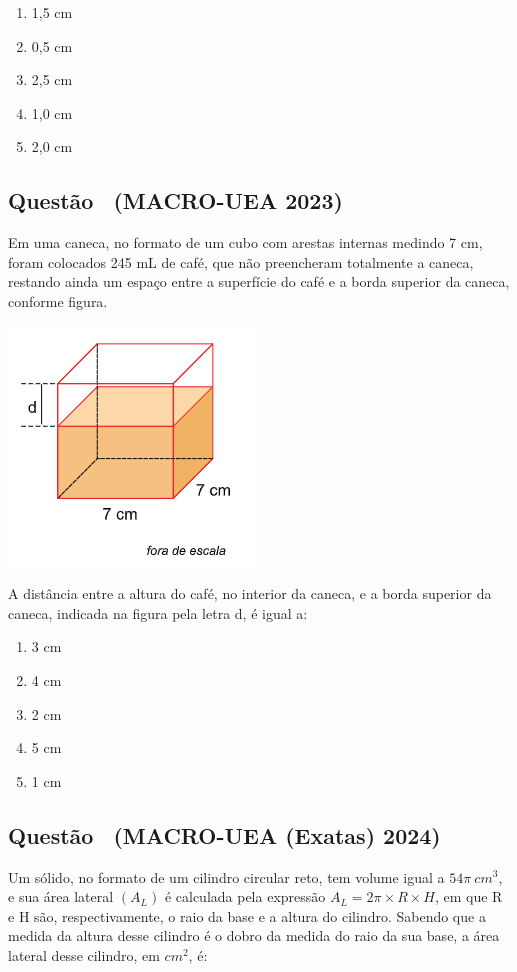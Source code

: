\documentclass[12pt]{article}
\newif\ifmostravermelho
\newcommand{\vermelho}[1]{%
  \ifmostravermelho
    {\color{red}#1}%
  \else
    #1%
  \fi
}
\newcounter{questao}
\newcommand{\novaquestao}[1]{%
  \stepcounter{questao}%
  \subsection*{Questão \thequestao\ (#1)}%
}
\begin{document}
\begin{multicols}{2}
            \begin{enumerate}[label=(\alph*), noitemsep]
                \item 1,5  cm
                \item 0,5  cm
                \item 2,5  cm
                \item 1,0  cm
                \item \vermelho{2,0  cm} %
            \end{enumerate}

        \novaquestao{MACRO-UEA 2023}
            Em uma caneca, no formato de um cubo com arestas internas medindo 7 cm, foram colocados 245 mL de café, que não preencheram totalmente a caneca, restando ainda um espaço entre a superfície do café e a borda superior da caneca, conforme figura.

            \begin{center}
                \includegraphics[scale=0.6]{q28.png}
            \end{center} A distância entre a altura do café, no interior da caneca, e a borda superior da caneca, indicada na figura pela letra d, é igual a:
        
            \begin{enumerate}[label=(\alph*), noitemsep]
                \item 3  cm
                \item 4  cm
                \item \vermelho{2  cm} %
                \item 5  cm
                \item 1  cm %
            \end{enumerate}

            \novaquestao{MACRO-UEA (Exatas) 2024}

                Um sólido, no formato de um cilindro circular reto, tem volume igual a $54\pi\ cm^{3}$, e sua área lateral $(A_{L})$ é calculada pela expressão $A_{L}=2\pi \times R \times H$, em que R e H são, respectivamente, o raio da base e a altura do cilindro. Sabendo que a medida da altura desse cilindro é o dobro da medida do raio da sua base, a área lateral desse cilindro, em $cm^{2}$, é:
            

\end{multicols}
\end{document}

